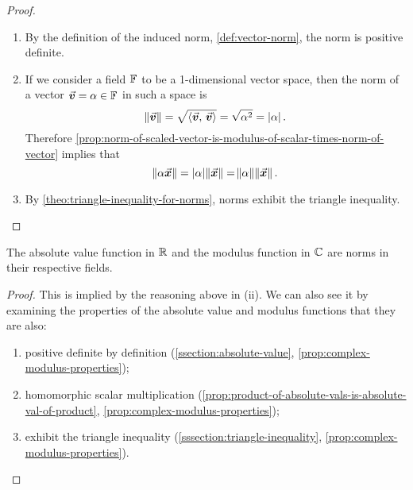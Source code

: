 \documentclass[../MathsNotesBase.tex]{subfiles}
\begin{document}
{		
		\biggerskip
		\begin{proof}\nl
			\begin{enumerate}[label=(\roman*)]
				\item{By the definition of the induced norm, \ref{def:vector-norm}, the norm is positive definite.}
				\item{If we consider a field $\mathbb{F}^{}$ to be a 1-dimensional vector space, then the norm of a vector $\vec{\bm{v}} = \alpha \in \mathbb{F}^{} $ in such a space is
					\[ \norm{\vec{\bm{v}}} = \sqrt{\langle \vec{\bm{v}},\, \vec{\bm{v}} \rangle} = \sqrt{\alpha^2} = \left\lvert\alpha\right\rvert. \]
					Therefore \autoref{prop:norm-of-scaled-vector-is-modulus-of-scalar-times-norm-of-vector} implies that
					\[ \norm{\alpha \vec{\bm{x}}} = \left\lvert\alpha\right\rvert \norm{\vec{\bm{x}}} = \norm{\alpha} \norm{\vec{\bm{x}}}. \]
				}
				\item{By \autoref{theo:triangle-inequality-for-norms}, norms exhibit the triangle inequality.}
			\end{enumerate}
		\end{proof}	
		\begin{corollary}
			The absolute value function in $\mathbb{R}^{}$ and the modulus function in $\mathbb{C}^{}$ are norms in their respective fields.
		\end{corollary}
		\begin{proof}
			This is implied by the reasoning above in (ii). We can also see it by examining the properties of the absolute value and modulus functions that they are also:
			\begin{enumerate}[label=(\roman*)]
				\item{positive definite by definition (\ref{ssection:absolute-value}, \ref{prop:complex-modulus-properties});}
				\item{homomorphic \wrt scalar multiplication (\ref{prop:product-of-absolute-vals-is-absolute-val-of-product}, \ref{prop:complex-modulus-properties});}
				\item{exhibit the triangle inequality (\ref{sssection:triangle-inequality}, \ref{prop:complex-modulus-properties}).}
			\end{enumerate}
		\end{proof}

	}
	
\end{document}
